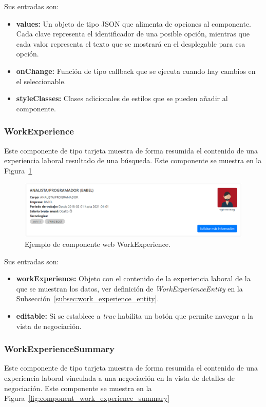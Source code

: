\documentclass[a4paper, 12pt]{book}
\begin{document}
Sus entradas son:

		\begin{itemize}
		\item \textbf{values:} Un objeto de tipo JSON que alimenta de opciones al componente. Cada clave representa el identificador de una posible opción, mientras que cada valor representa el texto que se mostrará en el desplegable para esa opción.
		\item \textbf{onChange:} Función de tipo callback que se ejecuta cuando hay cambios en el seleccionable.
		\item \textbf{styleClasses:} Clases adicionales de estilos que se pueden añadir al componente.
		\end{itemize}

\subsubsection{WorkExperience}
\label{subsec:wc_work_experience}
Este componente de tipo tarjeta muestra de forma resumida el contenido de una experiencia laboral resultado de una búsqueda.
Este componente se muestra en la Figura~\ref{fig:component_work_experience}

\begin{figure}
  \centering
  \includegraphics[width=15cm, keepaspectratio]{img/WorkExperience.PNG}
  \caption{Ejemplo de componente web WorkExperience.}\label{fig:component_work_experience}
\end{figure}

Sus entradas son:

		\begin{itemize}
		\item \textbf{workExperience:} Objeto con el contenido de la experiencia laboral de la que se muestran los datos, ver definición de \emph{WorkExperienceEntity} en la Subsección~\ref{subsec:work_experience_entity}.
		\item \textbf{editable:} Si se establece a \emph{true} habilita un botón que permite navegar a la vista de negociación.
		\end{itemize}

\subsubsection{WorkExperienceSummary}
\label{subsec:wc_work_experience_summary}
Este componente de tipo tarjeta muestra de forma resumida el contenido de una experiencia laboral vinculada a una negociación en la vista de detalles de negociación.
Este componente se muestra en la Figura~\ref{fig:component_work_experience_summary}
\end{document}
